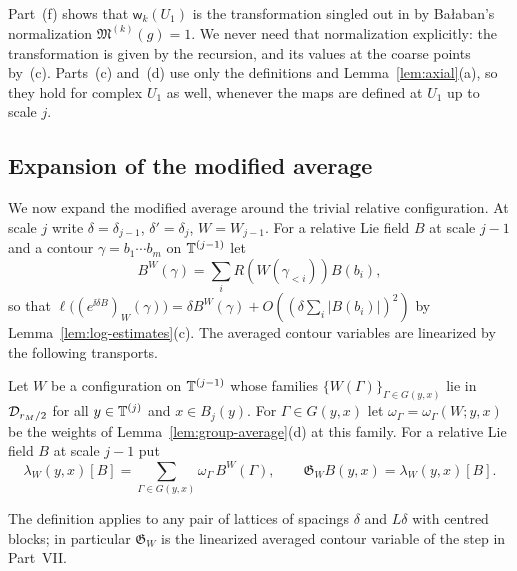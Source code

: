 Part~(f) shows that $\mathsf w_k(U_1)$ is the transformation singled out in \cite[(1.29)]{BalReg} by Ba\l aban's normalization $\mathfrak M^{(k)}(g)=1$. We never need that normalization explicitly: the transformation is given by the recursion, and its values at the coarse points by~(c). Parts~(c) and~(d) use only the definitions and Lemma~\ref{lem:axial}(a), so they hold for complex $U_1$ as well, whenever the maps are defined at $U_1$ up to scale $j$.

\subsection{Expansion of the modified average}\label{ss:22.4}

We now expand the modified average around the trivial relative configuration. At scale $j$ write $\delta=\delta_{j-1}$, $\delta'=\delta_j$, $W=W_{j-1}$. For a relative Lie field $B$ at scale $j-1$ and a contour $\gamma=b_1\cdots b_m$ on $\mathbb T^{(j-1)}$ let
\[
B^W(\gamma)=\sum_iR(W(\gamma_{<i}))B(b_i),
\]
so that $\ell\big((e^{\ii\delta B})_W(\gamma)\big)=\delta B^W(\gamma)+O((\delta\sum_i|B(b_i)|)^2)$ by Lemma~\ref{lem:log-estimates}(c). The averaged contour variables are linearized by the following transports.

\begin{definition}\label{def:avg-transport}
Let $W$ be a configuration on $\mathbb T^{(j-1)}$ whose families $\{W(\Gamma)\}_{\Gamma\in G(y,x)}$ lie in $\mathcal D_{r_M/2}$ for all $y\in\mathbb T^{(j)}$ and $x\in B_j(y)$. For $\Gamma\in G(y,x)$ let $\omega_\Gamma=\omega_\Gamma(W;y,x)$ be the weights of Lemma~\ref{lem:group-average}(d) at this family. For a relative Lie field $B$ at scale $j-1$ put
\[
\lambda_W(y,x)[B]=\sum_{\Gamma\in G(y,x)}\omega_\Gamma\,B^W(\Gamma),\qquad\mathfrak G_WB(y,x)=\lambda_W(y,x)[B].
\]
\end{definition}

The definition applies to any pair of lattices of spacings $\delta$ and $L\delta$ with centred blocks; in particular $\mathfrak G_W$ is the linearized averaged contour variable of the step in Part~VII.

